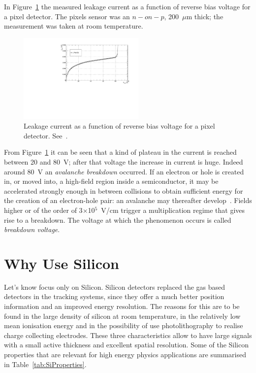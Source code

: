 In Figure~\ref{fig:IV_LPNHE5} the measured leakage current as a function of reverse bias voltage for 
a pixel detector. The pixels sensor was an $n-on-p$, 200~$\mu$m thick; the measurement was 
taken at room temperature.
\begin{figure}
\centering
\includegraphics[width=0.55\textwidth]{IV_LPNHE5.pdf}
\caption{\label{fig:IV_LPNHE5}Leakage current as a function of reverse bias voltage for 
a pixel detector. See~\cite{bib:nim2012,Bomben:2013cia}.}
\end{figure}
From Figure~\ref{fig:IV_LPNHE5} it can be seen that a kind of plateau in the current is reached 
between 20 and 80~V; after that voltage the increase in current is huge. Indeed around 80~V 
an {\it avalanche breakdown} occurred. If an electron or hole is created in, or moved into, a high-field 
region inside a semiconductor, it may be accelerated strongly enough in between collisions to obtain 
sufficient energy for the creation of an electron-hole pair: an avalanche may thereafter 
develop~\cite{Lutz:411172}.
Fields higher or of the order of 3$\times$10$^5$~V/cm trigger a multiplication regime that gives rise to a 
breakdown. The voltage at which the phenomenon occurs is called {\it breakdown voltage}.

\section{Why Use Silicon}
\label{sec:Silicon}
Let's know focus only on Silicon. Silicon detectors replaced the  gas based detectors in the tracking systems, since they offer a much
 better position information and an improved energy resolution. The reasons for this are to be found 
in the large density of silicon at room temperature, in the relatively low mean ionisation energy and 
in the possibility of use photolithography to realise charge collecting electrodes. 
These three characteristics allow to have large signals with a small active thickness and 
excellent spatial resolution. Some of the Silicon properties that are relevant for high energy 
physics applications are summarised in Table~\ref{tab:SiProperties}.


